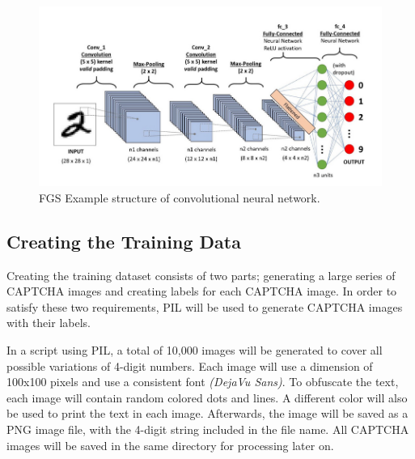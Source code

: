 \documentclass[11pt,conference]{IEEEtran}
\begin{document}
\begin{figure}[htbp]
	\centerline{\includegraphics[scale=0.25]{images/cnn-example.png}}
	\caption{FGS Example structure of convolutional neural network.}
	\label{figure}
\end{figure}


\subsection{Creating the Training Data}
Creating the training dataset consists of two parts; generating a large series
of CAPTCHA images and creating labels for each CAPTCHA image. In order to
satisfy these two requirements, PIL will be used to generate CAPTCHA images
with their labels. 

In a script using PIL, a total of 10,000 images will be generated to cover all
possible variations of 4-digit numbers. Each image will use a dimension of 
100x100 pixels and use a consistent font \emph{(DejaVu Sans)}. To obfuscate the
text, each image will contain random colored dots and lines. A different color
will also be used to print the text in each image. Afterwards, the image will be saved
as a PNG image file, with the 4-digit string included in the file name. All
CAPTCHA images will be saved in the same directory for processing later on.

\end{document}
